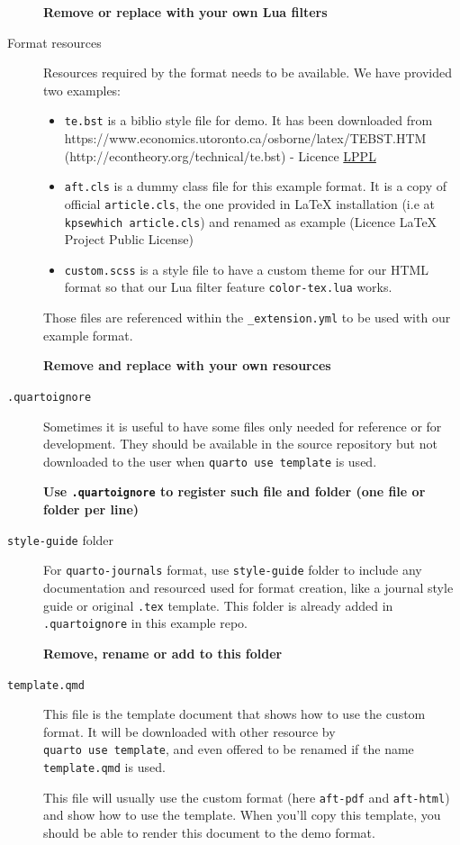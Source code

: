 \documentclass[
  10pt,
]{scrartcl}
\providecommand{\tightlist}{%
  \setlength{\itemsep}{0pt}\setlength{\parskip}{0pt}}\usepackage{longtable,booktabs,array}
\begin{document}
\begin{description}
\textbf{Remove or replace with your own Lua filters}
\item[Format resources]
Resources required by the format needs to be available. We have provided
two examples:

\begin{itemize}
\tightlist
\item
  \texttt{te.bst} is a biblio style file for demo. It has been
  downloaded from
  https://www.economics.utoronto.ca/osborne/latex/TEBST.HTM
  (http://econtheory.org/technical/te.bst) - Licence
  \href{https://www.latex-project.org/lppl/}{LPPL}
\item
  \texttt{aft.cls} is a dummy class file for this example format. It is
  a copy of official \texttt{article.cls}, the one provided in LaTeX
  installation (i.e at \texttt{kpsewhich\ article.cls}) and renamed as
  example (Licence LaTeX Project Public License)
\item
  \texttt{custom.scss} is a style file to have a custom theme for our
  HTML format so that our Lua filter feature \texttt{color-tex.lua}
  works.
\end{itemize}

Those files are referenced within the \texttt{\_extension.yml} to be
used with our example format.

\textbf{Remove and replace with your own resources}
\item[\texttt{.quartoignore}]
Sometimes it is useful to have some files only needed for reference or
for development. They should be available in the source repository but
not downloaded to the user when \texttt{quarto\ use\ template} is used.

\textbf{Use \texttt{.quartoignore} to register such file and folder (one
file or folder per line)}
\item[\texttt{style-guide} folder]
For \texttt{quarto-journals} format, use \texttt{style-guide} folder to
include any documentation and resourced used for format creation, like a
journal style guide or original \texttt{.tex} template. This folder is
already added in \texttt{.quartoignore} in this example repo.

\textbf{Remove, rename or add to this folder}
\item[\texttt{template.qmd}]
This file is the template document that shows how to use the custom
format. It will be downloaded with other resource by
\texttt{quarto\ use\ template}, and even offered to be renamed if the
name \texttt{template.qmd} is used.

This file will usually use the custom format (here \texttt{aft-pdf} and
\texttt{aft-html}) and show how to use the template. When you'll copy
this template, you should be able to render this document to the demo
format.


\end{description}
\end{document}
